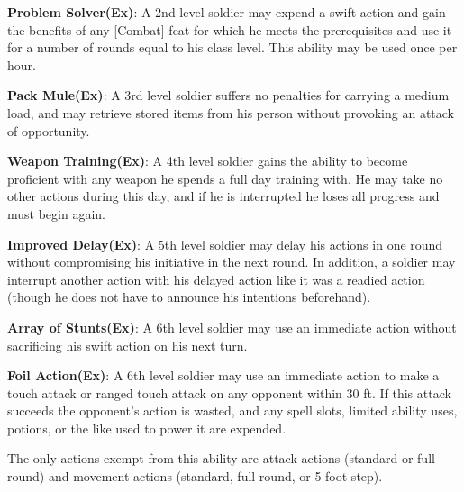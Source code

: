 \textbf{Problem Solver(Ex)}: A 2nd level soldier may expend a swift action and gain the benefits of any [Combat] feat for which he meets the prerequisites and use it for a number of rounds equal to his class level. This ability may be used once per hour.

\textbf{Pack Mule(Ex)}: A 3rd level soldier suffers no penalties for carrying a medium load, and may retrieve stored items from his person without provoking an attack of opportunity.

\textbf{Weapon Training(Ex)}: A 4th level soldier gains the ability to become proficient with any weapon he spends a full day training with. He may take no other actions during this day, and if he is interrupted he loses all progress and must begin again.

\textbf{Improved Delay(Ex)}: A 5th level soldier may delay his actions in one round without compromising his initiative in the next round. In addition, a soldier may interrupt another action with his delayed action like it was a readied action (though he does not have to announce his intentions beforehand).

\textbf{Array of Stunts(Ex)}: A 6th level soldier may use an immediate action without sacrificing his swift action on his next turn.

\textbf{Foil Action(Ex)}: A 6th level soldier may use an immediate action to make a touch attack or ranged touch attack on any opponent within 30 ft. If this attack succeeds the opponent's action is wasted, and any spell slots, limited ability uses, potions, or the like used to power it are expended.

The only actions exempt from this ability are attack actions (standard or full round) and movement actions (standard, full round, or 5-foot step).